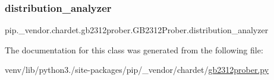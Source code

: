 \subsubsection{\texorpdfstring{distribution\+\_\+analyzer}{distribution\_analyzer}}
{\footnotesize\ttfamily pip.\+\_\+vendor.\+chardet.\+gb2312prober.\+G\+B2312\+Prober.\+distribution\+\_\+analyzer}



The documentation for this class was generated from the following file\+:\begin{DoxyCompactItemize}
\item 
venv/lib/python3./site-\/packages/pip/\+\_\+vendor/chardet/\hyperlink{gb2312prober_8py}{gb2312prober.\+py}\end{DoxyCompactItemize}
